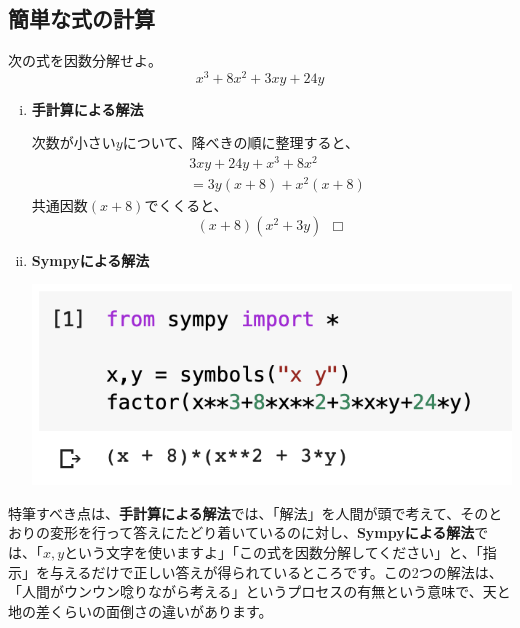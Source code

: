 \documentclass[12pt, a5paper]{jsbook}
\begin{document}
\subsection{簡単な式の計算}
\begin{framed}
\begin{exq}
次の式を因数分解せよ。
$$x^3+8x^2+3xy+24y$$
\end{exq}
\end{framed}
\begin{enumerate}[(i)]
    \item 
    {\bf 手計算による解法}
    
    次数が小さい$y$について、降べきの順に整理すると、
    \begin{align*}
        &3xy+24y+x^3+8x^2\\
        &= 3y(x+8)+x^2(x+8)
    \end{align*}
    共通因数$(x+8)$でくくると、
    $$(x+8)(x^2+3y)\ \ \Box$$
    \item
    
    {\bf Sympyによる解法}
    \begin{center}
    \includegraphics[scale=0.5]{fig1-2-1.png}
    \end{center}
\end{enumerate}
特筆すべき点は、{\bf 手計算による解法}では、「解法」を人間が頭で考えて、そのとおりの変形を行って答えにたどり着いているのに対し、{\bf Sympyによる解法}では、「$x,y$という文字を使いますよ」「この式を因数分解してください」と、「指示」を与えるだけで正しい答えが得られているところです。この2つの解法は、「人間がウンウン唸りながら考える」というプロセスの有無という意味で、天と地の差くらいの面倒さの違いがあります。
\end{document}
